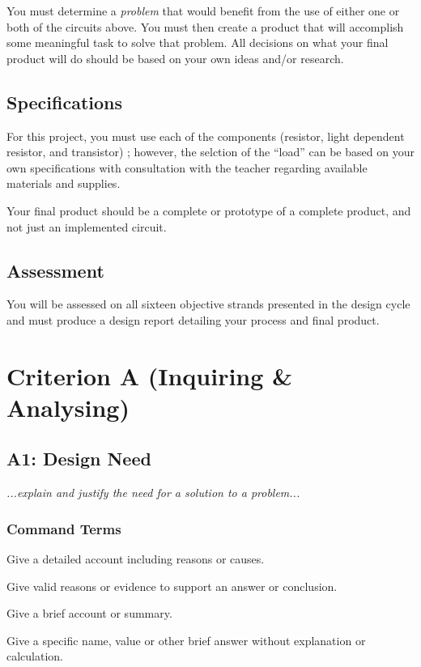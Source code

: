     \bigskip
    You must determine a \emph{problem} that would benefit from the use of either one or both of the circuits above. You must then create a product that will accomplish some meaningful task to solve that problem. All decisions on what your final product will do should be based on your own ideas and/or research.

    \subsection*{Specifications}
    For this project, you must use each of the components (resistor, light dependent resistor, and transistor) ; however, the selction of the ``load'' can be based on your own specifications with consultation with the teacher regarding available materials and supplies.

    \medskip
    Your final product should be a complete or prototype of a complete product, and not just an implemented circuit.
    \subsection*{Assessment}
    You will be assessed on all sixteen objective strands presented in the design cycle and must produce a design report detailing your process and final product.

    \pagebreak
    \section*{Criterion A (Inquiring \& Analysing)}

    \subsection*{A1: Design Need}
    \emph{...explain and justify the need for a solution to a problem...}

    \subsubsection*{Command Terms}
        \begin{description}
            \small
            \item[Explain] Give a detailed account including reasons or causes.
            \item[Justify] Give valid reasons or evidence to support an answer or conclusion.
            \item[Outline] Give a brief account or summary.
            \item[State] Give a specific name, value or other brief answer without explanation or calculation.
        \end{description}


